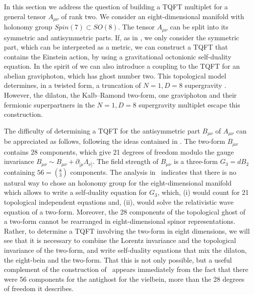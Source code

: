 \documentclass[a4paper,12pt]{article}
\begin{document}
In this section we address the question of building a TQFT multiplet
for a general tensor $A_{\mu\nu}$ of rank two.  We consider an
eight-dimensional manifold with holonomy group $Spin(7)\subset SO(8)$.
The tensor $A_{\mu\nu}$ can be split into its symmetric and
antisymmetric parts.  If, as in \cite{BT2},  we  only consider  the
symmetric part, which can be interpreted as a metric, we can construct
a TQFT that contains the Einstein action, by using a gravitational
octonionic self-duality equation. In the spirit of \cite{BT1} we can
also introduce a coupling to the TQFT for an abelian graviphoton, which
has ghost number two. This topological model determines, in a twisted
form, a truncation of $N=1,D=8$ supergravity \cite{BT2}.  However, the
dilaton, the Kalb--Ramond two-form, one graviphoton and their fermionic
superpartners in the $N=1,D=8$ supergravity multiplet \cite{sase}
escape this construction.

The  difficulty of determining a TQFT for the antisymmetric part
$B_{\mu\nu}$ of $A_{\mu\nu}$ can be appreciated as follows, following the ideas
contained in \cite{laroche}. The two-form $B_{\mu\nu}$ contains 28 components,
which  give 21 degrees of freedom modulo the gauge invariance  
$B_{\mu\nu}\sim B_{\mu\nu}+\partial_{[\mu}\Lambda_{\nu]}$.
The field strength of $B_{\mu\nu}$ is a three-form $G_3=dB_2$ containing
$56=(^8_3)$ components. The analysis in~\cite{laroche} indicates
that there is no natural way to chose an holonomy group for
the eight-dimensional manifold which allows to 
write a self-duality equation for $G_3$, which, (i)  
would count for 21 topological independent equations and, (ii),
would solve the relativistic wave equation of a two-form.
Moreover, the 28 components of the topological ghost of
a two-form cannot be rearranged in eight-dimensional spinor
representations. 
Rather, to determine a TQFT involving the two-form 
in eight dimensions, we will see that it is
necessary to combine the Lorentz invariance and the topological 
invariance of the two-form, and write self-duality equations that mix the
dilaton, the eight-bein and the two-form.  That this is not only possible,
but a useful complement of the construction of~\cite{BT2} appears
immediately from the fact that there were 56 components for the antighost
for the vielbein, more than the 28 degrees of freedom it describes.
\end{document}
